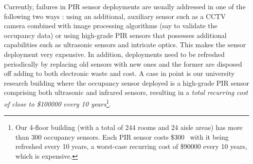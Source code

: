Currently, failures in PIR sensor deployments are usually addressed in one of the following two ways : \ca using an additional, auxiliary sensor such as a CCTV camera combined with image processing algorithms (say to validate the occupancy data) or \cb using high-grade PIR sensors that possesses additional capabilities such as ultrasonic sensors and intricate optics. This makes the sensor deployment very expensive. %
In addition, deployments need to be refreshed periodically by replacing old sensors with new ones and the former are disposed off %
adding to both electronic waste and cost. A case in point is our university research building where the occupancy sensor deployed is a high-grade PIR sensor comprising both ultrasonic and infrared sensors, resulting in a \emph{total recurring cost of close to \$100000 every 10 years}\footnote{Our 4-floor building (with a total of 244 rooms and 24 aisle areas) has more than 300 occupancy sensors. Each PIR sensor costs \$300~\cite{hubbell_ADT1600WRP, hubbell_ATD2000CRP} with it being refreshed every 10 years, a worst-case recurring cost of \$90000 every 10 years, which is expensive.}.

